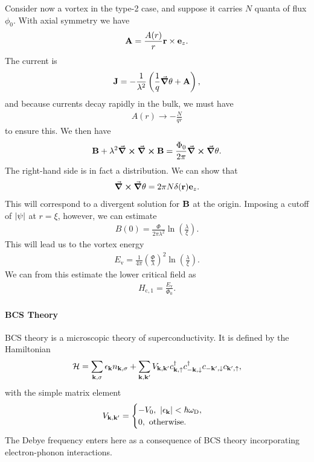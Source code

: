 Consider now a vortex in the type-2 case, and suppose it carries $N$ quanta of flux $\phi_{0}$. With axial symmetry we have
\begin{align*}
	\vb{A} = \frac{A(r)}{r}\vb{r}\times\vb{e}_{z}.
\end{align*}
The current is
\begin{align*}
	\vb{J} = -\frac{1}{\lambda^{2}}\left(\frac{1}{q}\grad{\theta} + \vb{A}\right),
\end{align*}
and because currents decay rapidly in the bulk, we must have
\begin{align*}
	A(r) \to -\frac{N}{qr}
\end{align*}
to ensure this. We then have
\begin{align*}
	\vb{B} + \lambda^{2}\curl{\curl{\vb{B}}} = \frac{\Phi_{0}}{2\pi}\curl{\grad{\theta}}.
\end{align*}
The right-hand side is in fact a distribution. We can show that
\begin{align*}
	\curl{\grad{\theta}} = 2\pi N\delta(\vb{r})\vb{e}_{z}.
\end{align*}
This will correspond to a divergent solution for $\vb{B}$ at the origin. Imposing a cutoff of $\abs{\psi}$ at $r = \xi$, however, we can estimate
\begin{align*}
	B(0) = \frac{\Phi}{2\pi\lambda^{2}}\ln(\frac{\lambda}{\xi}).
\end{align*}
This will lead us to the vortex energy
\begin{align*}
	E_{\text{v}} = \frac{1}{4\pi}\left(\frac{\Phi}{\lambda}\right)^{2}\ln(\frac{\lambda}{\xi}).
\end{align*}
We can from this estimate the lower critical field as
\begin{align*}
H_{\text{c}, 1} = \frac{E_{\text{v}}}{\Phi_{0}}.
\end{align*}

\paragraph{BCS Theory}
BCS theory is a microscopic theory of superconductivity. It is defined by the Hamiltonian
\begin{align*}
	\mathcal{H} = \sum\limits_{\vb{k}, \sigma}\epsilon_{\vb{k}}n_{\vb{k}, \sigma} + \sum\limits_{\vb{k}, \vb{k}^{\prime}}V_{\vb{k}, \vb{k}^{\prime}}c_{\vb{k}, \uparrow}^{\dagger} c_{-\vb{k}, \downarrow}^{\dagger} c_{-\vb{k}^{\prime}, \downarrow}c_{\vb{k}^{\prime}, \uparrow},
\end{align*}
with the simple matrix element
\begin{align*}
	V_{\vb{k}, \vb{k}^{\prime}} = \begin{cases}
		-V_{0},\ \abs{\epsilon_{\vb{k}}} < \hbar\omega_{\text{D}}, \\
		0,\ \text{otherwise.}
	\end{cases}
\end{align*}
The Debye frequency enters here as a consequence of BCS theory incorporating electron-phonon interactions.

